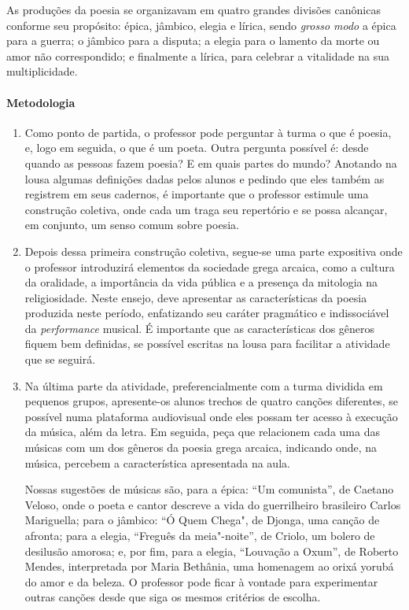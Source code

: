 \documentclass[12pt]{extarticle}
\begin{document}
As produções da poesia se organizavam em quatro grandes divisões canônicas conforme
seu propósito: épica, jâmbico, elegia e lírica, sendo \emph{grosso modo} a épica 
para a guerra; o jâmbico para a disputa; a elegia para o lamento da morte ou amor 
não correspondido; e finalmente a lírica, para celebrar a vitalidade na sua multiplicidade.


\paragraph{Metodologia} 

\begin{enumerate}
\item
Como ponto de partida, o professor pode perguntar à turma o que é poesia,
e, logo em seguida, o que é um poeta. Outra pergunta possível é: desde quando
as pessoas fazem poesia? E em quais partes do mundo? 
Anotando na lousa algumas definições dadas pelos alunos e pedindo que eles
também as registrem em seus cadernos, é importante que o professor estimule 
uma construção coletiva, onde cada um traga seu repertório e se possa alcançar,
em conjunto, um senso comum sobre poesia.

\item
Depois dessa primeira construção coletiva, segue-se uma parte expositiva onde 
o professor introduzirá elementos da sociedade grega arcaica, como a cultura
da oralidade, a importância da vida pública e a presença da mitologia na religiosidade. 
Neste ensejo, deve apresentar as características da poesia produzida neste período, 
enfatizando seu caráter pragmático e indissociável da \textit{performance} musical.
É importante que as características dos gêneros fiquem bem definidas, se possível
escritas na lousa para facilitar a atividade que se seguirá. 

\item
Na última parte da atividade, preferencialmente com a turma dividida em pequenos 
grupos, apresente-os alunos trechos de quatro canções diferentes, se possível numa 
plataforma audiovisual onde eles possam ter acesso à execução da música, além da letra. 
Em seguida, peça que relacionem cada uma das músicas com um dos gêneros da poesia grega 
arcaica, indicando onde, na música, percebem a característica apresentada na aula. 

Nossas sugestões de músicas são, para a épica: ``Um comunista'', de Caetano Veloso, 
onde o poeta e cantor descreve a vida do guerrilheiro brasileiro Carlos Mariguella;
para o jâmbico: ``Ó Quem Chega", de Djonga, uma canção de afronta; para a elegia, 
``Freguês da meia"-noite'', de Criolo, um bolero de desilusão amorosa; e, por fim,
para a elegia, ``Louvação a Oxum'', de Roberto Mendes, interpretada por Maria Bethânia,
uma homenagem ao orixá yorubá do amor e da beleza.
O professor pode ficar à vontade para experimentar outras canções desde que siga os
mesmos critérios de escolha.  

\end{enumerate}
\end{document}
